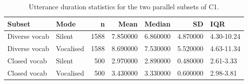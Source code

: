 \begin{table}
\caption{Utterance duration statistics for the two parallel subsets of C1.}
\label{tab:durations}
\begin{tabular}{llrrrrl}
\toprule
Subset & Mode & n & Mean & Median & SD & IQR \\
\midrule
Diverse vocab & Silent & 1588 & 7.850000 & 6.860000 & 4.870000 & 4.30-10.24 \\
Diverse vocab & Vocalised & 1588 & 8.690000 & 7.530000 & 5.520000 & 4.63-11.34 \\
Closed vocab & Silent & 500 & 2.970000 & 2.890000 & 0.480000 & 2.61-3.33 \\
Closed vocab & Vocalised & 500 & 3.430000 & 3.330000 & 0.600000 & 2.98-3.81 \\
\bottomrule
\end{tabular}
\end{table}
